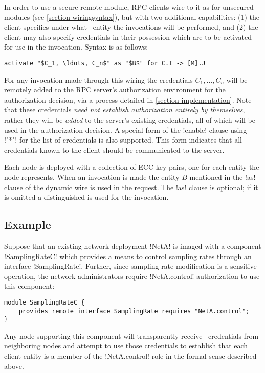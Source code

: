 In order to use a secure remote module, RPC clients wire to it as for unsecured modules (see
\autoref{section-wiringsyntax}), but with two additional capabilities: (1) the client specifies
under what \RT\ entity the invocations will be performed, and (2) the client may also specify
credentials in their possession which are to be activated for use in the invocation. Syntax is
as follows:
\begin{lstlisting}[mathescape=true]
activate "$C_1, \ldots, C_n$" as "$B$" for C.I -> [M].J
\end{lstlisting}
For any invocation made through this wiring the credentials $C_1, \ldots, C_n$ will be remotely
added to the RPC server's authorization environment for the authorization decision, via a
process detailed in \autoref{section-implementation}. Note that these credentials \emph{need not
  establish authorization entirely by themselves}, rather they will be \emph{added} to the
server's existing credentials, all of which will be used in the authorization decision. A
special form of the !enable! clause using !"*"! for the list of credentials is also supported.
This form indicates that all credentials known to the client should be communicated to the
server.

Each node is deployed with a collection of ECC key pairs, one for each entity the node
represents. When an invocation is made the entity $B$ mentioned in the !as! clause of the
dynamic wire is used in the request. The !as! clause is optional; if it is omitted a
distinguished  is used for the invocation.

\subsection{Example}
\label{section-security-example}

Suppose that an existing network deployment !NetA! is imaged with a component !SamplingRateC!
which provides a means to control sampling rates through an interface !SamplingRate!. Further,
since sampling rate modification is a sensitive operation, the network administrators require
!NetA.control! authorization to use this component:

\singlespace
\begin{lstlisting}
module SamplingRateC {
    provides remote interface SamplingRate requires "NetA.control";
}
\end{lstlisting}
\primaryspacing

Any node supporting this component will transparently receive \RT\ credentials from neighboring
nodes and attempt to use those credentials to establish that each client entity is a member of
the !NetA.control! role in the formal sense described above.

